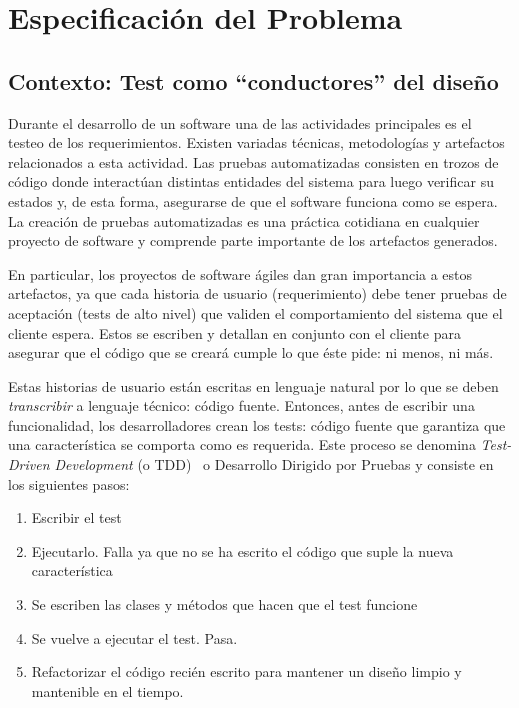\chapter{Especificación del Problema}



\section{Contexto: Test como ``conductores'' del diseño}
\par Durante el desarrollo de un software una de las actividades principales es el testeo de los requerimientos. Existen variadas técnicas, metodologías y artefactos relacionados a esta actividad. Las pruebas automatizadas consisten en trozos de código donde interactúan distintas entidades del sistema para luego verificar su estados y, de esta forma, asegurarse de que el software funciona como se espera. La creación de pruebas automatizadas es una práctica cotidiana en cualquier proyecto de software y comprende parte importante de los artefactos generados. \\

\par En particular, los proyectos de software ágiles dan gran importancia a estos artefactos, ya que cada historia de usuario (requerimiento) debe tener pruebas de aceptación (tests de alto nivel) que validen el comportamiento del sistema que el cliente espera. Estos se escriben y detallan en conjunto con el cliente para asegurar que el código que se creará cumple lo que éste pide: ni menos, ni más.

\par Estas historias de usuario están escritas en lenguaje natural por lo que se deben \emph{transcribir} a lenguaje técnico: código fuente. Entonces, antes de escribir una funcionalidad, los desarrolladores crean los tests: código fuente que garantiza que una característica se comporta como es requerida. Este proceso se denomina \emph{Test-Driven Development} (o TDD)~\cite{Beck02a}  o Desarrollo Dirigido por Pruebas y consiste en los siguientes pasos: 
\begin{enumerate}
\item Escribir el test
\item Ejecutarlo. Falla ya que no se ha escrito el código que suple la nueva característica
\item Se escriben las clases y métodos que hacen que el test funcione
\item Se vuelve a ejecutar el test. Pasa.
\item Refactorizar el código recién escrito para mantener un diseño limpio y mantenible en el tiempo.
\end{enumerate}

